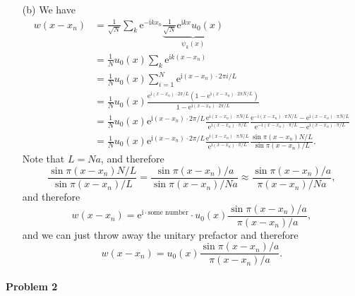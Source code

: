 \documentclass[hyperref, a4paper]{article}
\newcommand*{\ii}{\mathrm{i}}
\newcommand*{\ee}{\mathrm{e}}
\begin{document}
\begin{itemize}
\item[(b)] We have 
\[
    \begin{aligned}
        w(x - x_n) &= \frac{1}{\sqrt{N}} \sum_{k} 
        \ee^{- \ii k x_n} \underbrace{\frac{1}{\sqrt{N}} \ee^{\ii k x} u_0(x)}_{\psi_k(x)} \\
        &= \frac{1}{N} u_0(x) \sum_k \ee^{\ii k (x - x_n)} \\
        &= \frac{1}{N} u_0(x) \sum_{i=1}^N \ee^{\ii (x - x_n) \cdot 2\pi i / L} \\
        &= \frac{1}{N} u_0(x) \frac{
            \ee^{\ii (x - x_n) \cdot 2\pi / L} (1 - \ee^{\ii (x - x_n) \cdot 2\pi N / L})
        }{
            1 - \ee^{\ii (x - x_n) \cdot 2\pi / L}
        } \\
        &= \frac{1}{N} u_0(x) \ee^{\ii (x - x_n) \cdot 2\pi / L} 
        \frac{\ee^{\ii (x - x_n) \cdot \pi N / L}}{\ee^{\ii (x - x_n) \cdot \pi / L}}
        \frac{
            \ee^{- \ii (x - x_n) \cdot \pi N / L} - \ee^{\ii (x - x_n) \cdot \pi N / L}
        }{
           \ee^{- \ii (x - x_n) \cdot \pi / L} - \ee^{\ii (x - x_n) \cdot \pi / L}
        } \\
        &= \frac{1}{N} u_0(x) \ee^{\ii (x - x_n) \cdot 2\pi / L} 
        \frac{\ee^{\ii (x - x_n) \cdot \pi N / L}}{\ee^{\ii (x - x_n) \cdot \pi / L}}
        \frac{\sin \pi (x - x_n) N / L}{\sin \pi (x - x_n) / L}.
    \end{aligned}
\]
Note that $L = Na$, and therefore 
\[
    \frac{\sin \pi (x - x_n) N / L}{\sin \pi (x - x_n) / L}
    = \frac{\sin \pi (x - x_n) / a}{\sin \pi (x - x_n) / Na}
    \approx \frac{\sin \pi (x - x_n) / a}{\pi (x - x_n) / Na},
\]
and therefore 
\begin{equation}
    w(x - x_n) = \ee^{\ii \cdot \text{some number}} 
    \cdot u_0(x) \frac{\sin \pi (x - x_n) / a}{\pi (x - x_n) / a},
\end{equation}
and we can just throw away the unitary prefactor and therefore 
\begin{equation}
    w(x - x_n) = u_0(x) \frac{\sin \pi (x - x_n) / a}{\pi (x - x_n) / a}.
\end{equation}

\end{itemize}


\paragraph{Problem 2}
\end{document}
